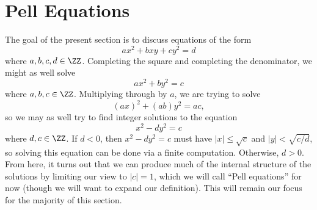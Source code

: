 \documentclass[../notes.tex]{subfiles}
\begin{document}
\section{Pell Equations}
The goal of the present section is to discuss equations of the form
\[ax^2+bxy+cy^2=d\]
where $a,b,c,d\in\ZZ$. Completing the square and completing the denominator, we might as well solve
\[ax^2+by^2=c\]
where $a,b,c\in\ZZ$. Multiplying through by $a$, we are trying to solve
\[(ax)^2+(ab)y^2=ac,\]
so we may as well try to find integer solutions to the equation
\[x^2-dy^2=c\]
where $d,c\in\ZZ$. If $d<0$, then $x^2-dy^2=c$ must have $\left|x\right|\le\sqrt c$ and $\left|y\right|<\sqrt{c/d}$, so solving this equation can be done via a finite computation. Otherwise, $d>0$. From here, it turns out that we can produce much of the internal structure of the solutions by limiting our view to $\left|c\right|=1$, which we will call ``Pell equations'' for now (though we will want to expand our definition). This will remain our focus for the majority of this section.
\end{document}
